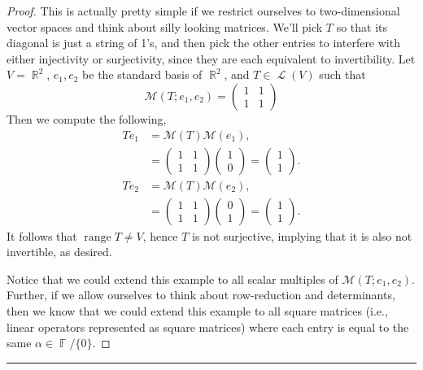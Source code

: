 \documentclass[letterpaper, 12pt]{amsart}
\DeclareMathOperator{\R}{\mathbb{R}}				%
\DeclareMathOperator{\F}{\mathbb{F}}				%
\DeclareMathOperator{\Ell}{\mathscr{L}}				%
\DeclareMathOperator{\range}{\text{range }}			%
\theoremstyle{definition}  							%
\begin{document}
		\begin{proof}
		This is actually pretty simple if we restrict ourselves to two-dimensional vector spaces and think about silly looking matrices.
		We'll pick $T$ so that its diagonal is just a string of 1's, and then pick the other entries to interfere with either injectivity or surjectivity, since they are each equivalent to invertibility.
		Let $V = \R^{2}$, $e_{1},e_{2}$ be the standard basis of $\R^2$, and $T \in \Ell(V)$ such that $$\mathcal{M}(T; e_{1},e_{2}) = \begin{pmatrix} 1 & 1 \\ 1 & 1 \end{pmatrix}$$
		Then we compute the following,
			\begin{align*}
				Te_{1} &= \mathcal{M}(T)\mathcal{M}(e_{1}), \\
				&= \begin{pmatrix} 1 & 1 \\ 1 & 1 \end{pmatrix} \begin{pmatrix} 1 \\ 0 \end{pmatrix} = \begin{pmatrix} 1 \\ 1 \end{pmatrix}.
			\end{align*}
			\begin{align*}
				Te_{2} &= \mathcal{M}(T)\mathcal{M}(e_{2}), \\
				&= \begin{pmatrix} 1 & 1 \\ 1 & 1 \end{pmatrix} \begin{pmatrix} 0 \\ 1 \end{pmatrix} = \begin{pmatrix} 1 \\ 1 \end{pmatrix}.
			\end{align*}
		It follows that $\range T \neq V$, hence $T$ is not surjective, implying that it is also not invertible, as desired.

		Notice that we could extend this example to all scalar multiples of $\mathcal{M}(T; e_{1},e_{2})$.
		Further, if we allow ourselves to think about row-reduction and determinants, then we know that we could extend this example to all square matrices (i.e., linear operators represented as square matrices) where each entry is equal to the same $\alpha \in \F/\{0\}$.
		\end{proof}
		\vspace*{2mm}
		\hrule
		\vspace*{2mm}
\end{document}
